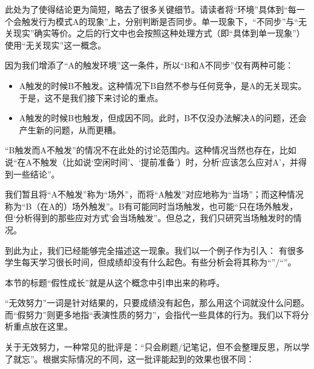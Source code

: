 \begin{explain}
此处为了使得结论更为简短，略去了很多关键细节。请读者将“环境”具体到“每一个会触发行为模式A的现象”上，分别判断是否同步。单一现象下，“不同步”与“无关现实”确实等价。之后的行文中也会按照这种处理方式（即“具体到单一现象”）使用“无关现实”这一概念。

因为我们增添了“A的触发环境”这一条件，所以“B和A不同步”仅有两种可能：
\begin{itemize}
\item A触发的时候B不触发。这种情况下B自然不参与任何竞争，是A的无关现实。于是，这不是我们接下来讨论的重点。
\item A触发的时候B也触发，但成因不同。此时，B不仅没办法解决A的问题，还会产生新的问题，从而更糟。
\end{itemize}
“B触发而A不触发”的情况不在此处的讨论范围内。这种情况当然也存在，比如说“在A不触发（比如说‘空闲时间’、‘提前准备’）时，分析‘应该怎么应对A’，并得到一些结论”。

我们暂且将“A不触发”称为“场外”，而将“A触发”对应地称为“当场”；而这种情况称为“B（在A的）场外触发”。B有可能同时当场触发，也可能“只在场外触发，但‘分析得到的那些应对方式’会当场触发”。但总之，我们只研究当场触发时的情况。
\end{explain}
到此为止，我们已经能够完全描述这一现象。我们以一个例子作为引入：
\divider
有很多学生每天学习很长时间，但成绩却没有什么起色。有些分析会将其称为“”/“”。
\begin{explain}
本节的标题“假性成长”就是从这个概念中引申出来的称呼。

“无效努力”一词是针对结果的，只要成绩没有起色，那么用这个词就没什么问题。而“假努力”则更多地指“表演性质的努力”，会指代一些具体的行为。我们以下将分析重点放在这里。
\end{explain}
关于无效努力，一种常见的批评是：“只会刷题/记笔记，但不会整理反思，所以学了就忘”。根据实际情况的不同，这一批评能起到的效果也很不同：
